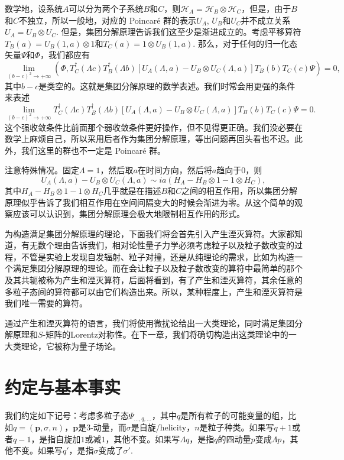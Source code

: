 \documentclass[11pt]{article}
\theoremstyle{definition}
\theoremstyle{plain}
\begin{document}
数学地，设系统$A$可以分为两个子系统$B$和$C$，则$\mathcal{H}_A=\mathcal{H}_B\otimes \mathcal{H}_C$，但是，由于$B$和$C$不独立，所以一般地，对应的 Poincar\'{e} 群的表示$U_A$, $U_B$和$U_C$并不成立关系$U_A=U_B\otimes U_C$. 但是，集团分解原理告诉我们这至少是渐进成立的。考虑平移算符$T_B(a)=U_B(1,a)\otimes 1$和$T_C(a)=1 \otimes U_B(1,a)$. 那么，对于任何的归一化态矢量$\Psi$和$\Phi$，我们都应有
\[
	\lim_{(b-c)^2\to +\infty} \left(\Phi,T_C^\dag(\Lambda c) T_B^\dag(\Lambda b) \left[U_A(\Lambda,a)-U_B\otimes U_C(\Lambda,a)\right]T_B(b)T_C(c)\Psi\right)=0,
\]
其中$b-c$是类空的。这就是集团分解原理的数学表述。我们时常会用更强的条件来表述
\[
	\lim_{(b-c)^2\to +\infty}T_C^\dag(\Lambda c) T_B^\dag(\Lambda b) \left[U_A(\Lambda,a)-U_B\otimes U_C(\Lambda,a)\right]T_B(b)T_C(c)\Psi=0.
\]
这个强收敛条件比前面那个弱收敛条件更好操作，但不见得更正确。我们没必要在数学上麻烦自己，所以采用后者作为集团分解原理，等出问题再回头看也不迟。此外，我们这里的群也不一定是 Poincar\'{e} 群。

注意特殊情况。固定$\Lambda=1$，然后取$a$在时间方向，然后将$a$趋向于$0$，则
\[
	U_A(\Lambda,a)-U_B\otimes U_C(\Lambda,a)\sim ia (H_A-H_B\otimes 1-1\otimes H_C),
\]
其中$H_A-H_B\otimes 1-1\otimes H_C$几乎就是在描述$B$和$C$之间的相互作用，所以集团分解原理似乎告诉了我们相互作用在空间间隔变大的时候会渐进为零。从这个简单的观察应该可以认识到，集团分解原理会极大地限制相互作用的形式。

为构造满足集团分解原理的理论，下面我们将会首先引入产生湮灭算符。大家都知道，有无数个理由告诉我们，相对论性量子力学必须考虑粒子以及粒子数改变的过程，不管是实验上发现自发辐射、粒子对撞，还是从纯理论的需求，比如为构造一个满足集团分解原理的理论。而在会让粒子以及粒子数改变的算符中最简单的那个及其共轭被称为产生和湮灭算符，后面将看到，有了产生和湮灭算符，其余任意的多粒子态间的算符都可以由它们构造出来。所以，某种程度上，产生和湮灭算符是我们唯一需要的算符。

通过产生和湮灭算符的语言，我们将使用微扰论给出一大类理论，同时满足集团分解原理和$S$-矩阵的Lorentz对称性。在下一章，我们将确切构造出这类理论中的一大类理论，它被称为量子场论。

\section{约定与基本事实}

我们约定如下记号：考虑多粒子态$\Psi_{\dots,q,\dots}$，其中$q$是所有粒子的可能变量的组，比如$q=(\bm{p},\sigma,n)$，$\bm{p}$是3-动量，而$\sigma$是自旋/helicity，$n$是粒子种类。如果写$q+1$或者$q-1$，是指自旋加$1$或减$1$，其他不变。如果写$\Lambda q$，是指$q$的四动量$p$变成$\Lambda p$，其他不变。如果写$q'$，是指$\sigma$变成了$\sigma'$.
\end{document}
